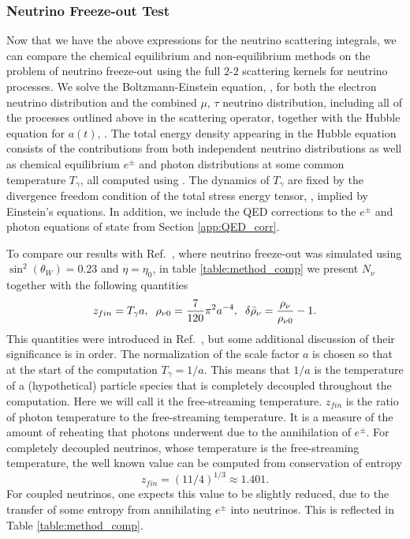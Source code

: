 
\subsubsection{ Neutrino Freeze-out Test}
Now that we have the above expressions for the neutrino scattering integrals, we can compare the chemical equilibrium and non-equilibrium methods on the problem of neutrino freeze-out using the full $2$-$2$ scattering kernels for neutrino processes.  We solve the Boltzmann-Einstein equation, , for both the electron neutrino distribution and the combined $\mu$, $\tau$ neutrino distribution, including all of the  processes outlined above in the scattering operator, together with the Hubble equation for $a(t)$, .  The total energy density  appearing in the Hubble equation consists of the contributions from both independent neutrino distributions as well as chemical equilibrium $e^\pm$ and photon distributions at some common temperature $T_\gamma$, all computed using .  The dynamics of $T_\gamma$ are fixed by the divergence freedom condition of the total stress energy tensor, , implied by Einstein's equations.  In addition, we include the QED corrections to the $e^\pm$ and photon equations of state from Section \ref{app:QED_corr}.



To compare our results with Ref.~\cite{Mangano:2005cc}, where neutrino freeze-out was simulated using $\sin^2(\theta_W)=0.23$ and $\eta=\eta_0$, in table \ref{table:method_comp} we present $N_\nu$ together with the following quantities
\begin{align}
 z_{fin}=T_\gamma a,\hspace{2mm}  \rho_{\nu 0}=\frac{7}{120}\pi^2a^{-4}, \hspace{2mm}  \delta\bar\rho_{\nu}= \frac{\rho_\nu}{\rho_{\nu 0}}-1.
\end{align}
This quantities were introduced in Ref.~\cite{Mangano:2005cc}, but some additional discussion of their significance is in order.  The normalization of the scale factor $a$ is chosen so that at the start of the computation $T_\gamma=1/a$.  This means that $1/a$ is the temperature of a (hypothetical) particle species that is completely decoupled throughout the computation.  Here we will call it the free-streaming temperature.   $z_{fin}$ is the ratio of photon temperature to the free-streaming temperature.  It is a measure of the amount of reheating that photons underwent due to the annihilation of $e^\pm$.  For completely decoupled neutrinos, whose temperature is the free-streaming temperature, the well known value can be computed from conservation of entropy
\begin{equation}
z_{fin}=(11/4)^{1/3}\approx 1.401.
\end{equation}
For coupled neutrinos, one expects this value to be slightly reduced, due to the  transfer of some entropy from annihilating $e^\pm$ into neutrinos. This is reflected in Table \ref{table:method_comp}.

